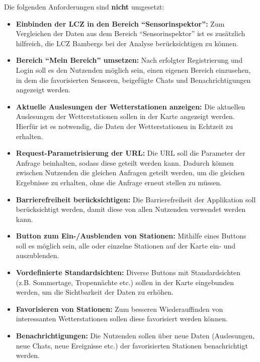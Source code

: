 Die folgenden Anforderungen sind \textbf{nicht} umgesetzt:

\begin{itemize}
    \item \textbf{Einbinden der \ac{LCZ} in den Bereich \enquote{Sensorinspektor}:} Zum Vergleichen der Daten aus dem Bereich \enquote{Sensorinspektor} ist es zusätzlich hilfreich, die \ac{LCZ} Bambergs bei der Analyse berücksichtigen zu können.
    \item \textbf{Bereich \enquote{Mein Bereich} umsetzen:} Nach erfolgter Registrierung und Login soll es den Nutzenden möglich sein, einen eigenen Bereich einzusehen, in dem die favorisierten Sensoren, beigefügte Chats und Benachrichtigungen angezeigt werden.
    \item \textbf{Aktuelle Auslesungen der Wetterstationen anzeigen:} Die aktuellen Auslesungen der Wetterstationen sollen in der Karte angezeigt werden. Hierfür ist es notwendig, die Daten der Wetterstationen in Echtzeit zu erhalten.
    \item \textbf{Request-Parametrisierung der URL:} Die URL soll die Parameter der Anfrage beinhalten, sodass diese geteilt werden kann. Dadurch können zwischen Nutzenden die gleichen Anfragen geteilt werden, um die gleichen Ergebnisse zu erhalten, ohne die Anfrage erneut stellen zu müssen.
    \item \textbf{Barrierefreiheit berücksichtigen:} Die Barrierefreiheit der Applikation soll berücksichtigt werden, damit diese von allen Nutzenden verwendet werden kann.
    \item \textbf{Button zum Ein-/Ausblenden von Stationen:} Mithilfe eines Buttons soll es möglich sein, alle oder einzelne Stationen auf der Karte ein- und auszublenden.
    \item \textbf{Vordefinierte Standardsichten:} Diverse Buttons mit Standardsichten (z.B. Sommertage, Tropennächte etc.) sollen in der Karte eingebunden werden, um die Sichtbarkeit der Daten zu erhöhen.
    \item \textbf{Favorisieren von Stationen:} Zum besseren Wiederauffinden von interessanten Wetterstationen sollen diese favorisiert werden können.
    \item \textbf{Benachrichtigungen:} Die Nutzenden sollen über neue Daten (Auslesungen, neue Chats, neue Ereignisse etc.) der favorisierten Stationen benachrichtigt werden.
\end{itemize}

